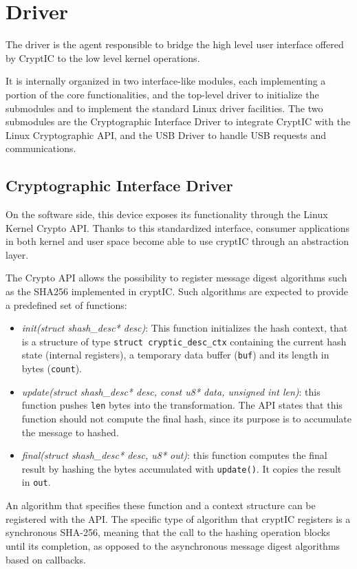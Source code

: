 \section{Driver}
The driver is the agent responsible to bridge the high level user interface offered by CryptIC to the low level kernel operations.

It is internally organized in two interface-like modules, each implementing a portion of the core functionalities, and the top-level driver to initialize the submodules and to implement the standard Linux driver facilities. The two submodules are the Cryptographic Interface Driver to integrate CryptIC with the Linux Cryptographic API, and the USB Driver to handle USB requests and communications.

\subsection{Cryptographic Interface Driver}
On the software side, this device exposes its functionality through the Linux Kernel Crypto API. Thanks to this standardized interface, consumer applications in both kernel and user space become able to use cryptIC through an abstraction layer.

The Crypto API allows the possibility to register message digest algorithms such as the SHA256 implemented in cryptIC. Such algorithms are expected to provide a predefined set of functions:
\begin{itemize}
\item \textit{init(struct shash\_desc* desc)}: This function initializes the hash context, that is a structure of type \texttt{struct cryptic\_desc\_ctx} containing the current hash state (internal registers), a temporary data buffer (\texttt{buf}) and its length in bytes (\texttt{count}).
\item \textit{update(struct shash\_desc* desc, const u8* data, unsigned int len)}: this function pushes \texttt{len} bytes into the transformation. The API states that this function should not compute the final hash, since its purpose is to accumulate the message to hashed. 
\item \textit{final(struct shash\_desc* desc, u8* out)}: this function computes the final result by hashing the bytes accumulated with \texttt{update()}. It copies the result in \texttt{out}.
\end{itemize}

An algorithm that specifies these function and a context structure can be registered with the API. The specific type of algorithm that cryptIC registers is a synchronous SHA-256, meaning that the call to the hashing operation blocks until its completion, as opposed to the asynchronous message digest algorithms based on callbacks.

